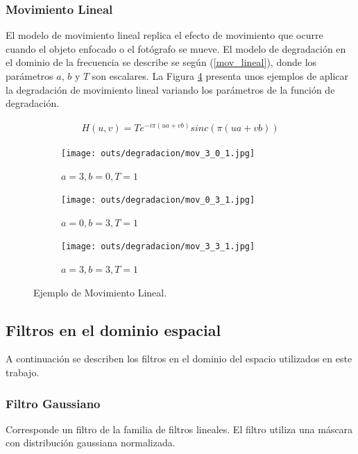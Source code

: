 \documentclass[
  letterpaper,
  twocolumn,
  9pt,
  journal,
  final]{IEEEtran}
\begin{document}
\subsubsection{Movimiento Lineal} \label{mov_lineal_sec}

El modelo de movimiento lineal replica el efecto de movimiento que ocurre cuando el objeto enfocado o el fotógrafo se mueve. El modelo de degradación en el dominio de la frecuencia se describe se según (\ref{mov_lineal}), donde los parámetros $a$, $b$ y $T$ son escalares. La Figura \ref{Movimiento_Lineal} presenta unos ejemplos de aplicar la degradación de movimiento lineal variando los parámetros de la función de degradación.

\begin{align}
  H(u,v) = T e^{-i\pi (ua + vb)} sinc( \pi (ua + vb)) \label{mov_lineal}
\end{align}

\begin{figure}[!tbh]
  \centering
  \begin{subfigure}[b]{.32\linewidth}
    \texttt{[image: outs/degradacion/mov\_3\_0\_1.jpg]}
    \caption{$a=3, b=0, T=1$}\label{mov1}
  \end{subfigure}
  \begin{subfigure}[b]{.32\linewidth}
    \texttt{[image: outs/degradacion/mov\_0\_3\_1.jpg]}
    \caption{$a=0, b=3, T=1$}\label{mov2}
  \end{subfigure}
  \begin{subfigure}[b]{.32\linewidth}
    \texttt{[image: outs/degradacion/mov\_3\_3\_1.jpg]}
    \caption{$a=3, b=3, T=1$}\label{mov3}
  \end{subfigure}
  \caption{Ejemplo de Movimiento Lineal.}
  \label{Movimiento_Lineal}
\end{figure}

\subsection{Filtros en el dominio espacial}

A continuación se describen los filtros en el dominio del espacio utilizados en este trabajo.

\subsubsection{Filtro Gaussiano}
Corresponde un filtro de la familia de filtros lineales. El filtro utiliza una máscara con distribución gaussiana normalizada.
\end{document}
